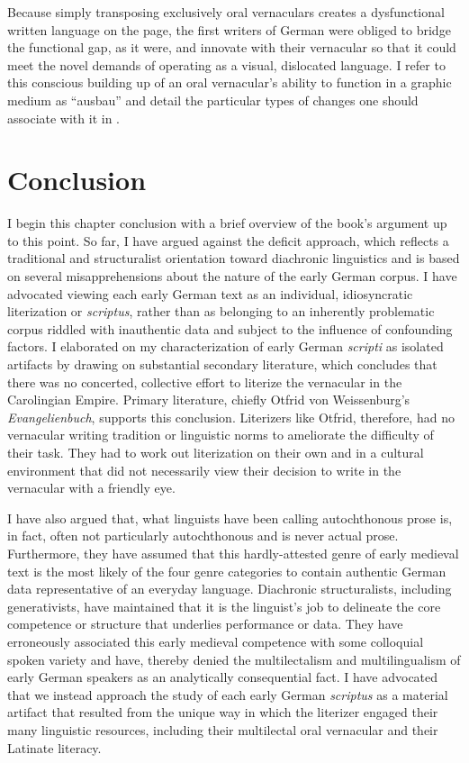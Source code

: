 Because simply transposing exclusively oral vernaculars creates a dysfunctional written language on the page, the first writers of German were obliged to bridge the functional gap, as it were, and innovate with their vernacular so that it could meet the novel demands of operating as a visual, dislocated language. I refer to this conscious building up of an oral vernacular’s ability to function in a graphic medium as “ausbau” and detail the particular types of changes one should associate with it in .

\section{Conclusion}\label{sec:3:3.3}

I begin this chapter conclusion with a brief overview of the book’s argument up to this point. So far, I have argued against the deficit approach, which reflects a traditional and structuralist orientation toward diachronic linguistics and is based on several misapprehensions about the nature of the early German corpus. I have advocated viewing each early German text as an individual, idiosyncratic literization or \textit{scriptus}, rather than as belonging to an inherently problematic corpus riddled with inauthentic data and subject to the influence of confounding factors. I elaborated on my characterization of early German \textit{scripti} as isolated artifacts by drawing on substantial secondary literature, which concludes that there was no concerted, collective effort to literize the vernacular in the Carolingian Empire. Primary literature, chiefly Otfrid von Weissenburg’s \textit{Evangelienbuch}, supports this conclusion. Literizers like Otfrid, therefore, had no vernacular writing tradition or linguistic norms to ameliorate the difficulty of their task. They had to work out literization on their own and in a cultural environment that did not necessarily view their decision to write in the vernacular with a friendly eye.

I have also argued that, what linguists have been calling autochthonous prose is, in fact, often not particularly autochthonous and is never actual prose. Furthermore, they have assumed that this hardly-attested genre of early medieval text is the most likely of the four genre categories to contain authentic German data representative of an everyday language. Diachronic structuralists, including generativists, have maintained that it is the linguist’s job to delineate the core competence or structure that underlies performance or data. They have erroneously associated this early medieval competence with some colloquial spoken variety and have, thereby denied the multilectalism and multilingualism of early German speakers as an analytically consequential fact. I have advocated that we instead approach the study of each early German \textit{scriptus} as a material artifact that resulted from the unique way in which the literizer engaged their many linguistic resources, including their multilectal oral vernacular and their Latinate literacy.

